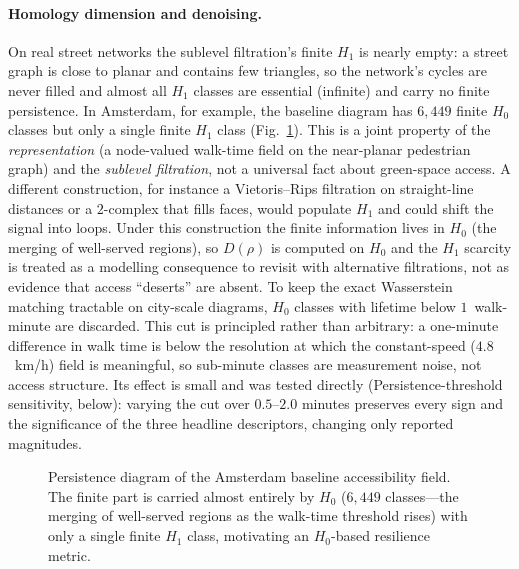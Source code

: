 \documentclass[sn-mathphys-num,pdflatex]{sn-jnl}
\newcommand{\Drho}{D(\rho)}
\begin{document}
\paragraph{Homology dimension and denoising.} On real street networks the
sublevel filtration's finite $H_1$ is nearly empty: a street graph is close to
planar and contains few triangles, so the network's cycles are never filled and
almost all $H_1$ classes are essential (infinite) and carry no finite persistence.
In Amsterdam, for example, the baseline diagram has $6{,}449$ finite $H_0$ classes
but only a single finite $H_1$ class (Fig.~\ref{fig:persistence}). This is a joint
property of the \emph{representation} (a node-valued walk-time field on the
near-planar pedestrian graph) and the \emph{sublevel filtration}, not a universal
fact about green-space access. A different construction, for instance a
Vietoris--Rips filtration on straight-line distances or a $2$-complex that fills
faces, would populate $H_1$ and could shift the signal into loops. Under this
construction the finite information lives in $H_0$ (the merging of well-served
regions), so $\Drho$ is computed on $H_0$ and the $H_1$ scarcity is treated as a
modelling consequence to revisit with alternative filtrations, not as evidence that
access ``deserts'' are absent. To keep the exact Wasserstein matching tractable
on city-scale diagrams, $H_0$ classes with lifetime below $1$~walk-minute are discarded.
This cut is principled rather than arbitrary: a one-minute difference in walk time
is below the resolution at which the constant-speed ($4.8$~km/h) field is
meaningful, so sub-minute classes are measurement noise, not access structure. Its
effect is small and was tested directly (Persistence-threshold sensitivity, below):
varying the cut over $0.5$--$2.0$ minutes preserves every sign and the significance
of the three headline descriptors, changing only reported magnitudes.

\begin{figure}[t]\centering
{}
\caption{Persistence diagram of the Amsterdam baseline accessibility field. The
finite part is carried almost entirely by $H_0$ ($6{,}449$ classes---the merging
of well-served regions as the walk-time threshold rises) with only a single finite
$H_1$ class, motivating an $H_0$-based resilience metric.}
\label{fig:persistence}
\end{figure}
\end{document}
